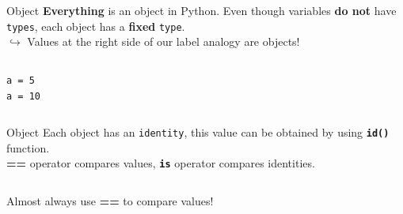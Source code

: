     \begin{frame}{Object}
        \LARGE
        \textbf{Everything} is an object in Python.
         Even though variables \textbf{do not} have \texttt{types}, each object has a \textbf{fixed} \texttt{type}.\\
        $\hookrightarrow$ Values at the right side of our label analogy are objects!
        
        \begin{columns}
            \begin{column}[c]{0.5\textwidth}
                \LARGE
                \texttt{a = 5}\\
                \texttt{a = 10}\\
                
            \end{column}
            \begin{column}[c]{0.5\textwidth}
           \end{column}
       \end{columns}
    \end{frame}

    \begin{frame}{Object}
        \LARGE
        Each object has an \texttt{identity},
         this value can be obtained by using \texttt{\textbf{id()}} function.\\
        \textbf{==} operator compares values, \textbf{\texttt{is}} operator compares identities. 
        \bigskip
        \inputminted[frame=single,framesep=2pt,lastline=4]{python3}{../Lecture6/code-examples/identity.py}
        Almost always use \textbf{==} to compare values!
    \end{frame}

